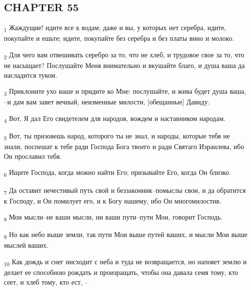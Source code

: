 \subsection{CHAPTER 55}
\begin{tcolorbox}
\textsubscript{1} Жаждущие! идите все к водам; даже и вы, у которых нет серебра, идите, покупайте и ешьте; идите, покупайте без серебра и без платы вино и молоко.
\end{tcolorbox}
\begin{tcolorbox}
\textsubscript{2} Для чего вам отвешивать серебро за то, что не хлеб, и трудовое свое за то, что не насыщает? Послушайте Меня внимательно и вкушайте благо, и душа ваша да насладится туком.
\end{tcolorbox}
\begin{tcolorbox}
\textsubscript{3} Приклоните ухо ваше и придите ко Мне: послушайте, и жива будет душа ваша, --и дам вам завет вечный, неизменные милости, [обещанные] Давиду.
\end{tcolorbox}
\begin{tcolorbox}
\textsubscript{4} Вот, Я дал Его свидетелем для народов, вождем и наставником народам.
\end{tcolorbox}
\begin{tcolorbox}
\textsubscript{5} Вот, ты призовешь народ, которого ты не знал, и народы, которые тебя не знали, поспешат к тебе ради Господа Бога твоего и ради Святаго Израилева, ибо Он прославил тебя.
\end{tcolorbox}
\begin{tcolorbox}
\textsubscript{6} Ищите Господа, когда можно найти Его; призывайте Его, когда Он близко.
\end{tcolorbox}
\begin{tcolorbox}
\textsubscript{7} Да оставит нечестивый путь свой и беззаконник--помыслы свои, и да обратится к Господу, и Он помилует его, и к Богу нашему, ибо Он многомилостив.
\end{tcolorbox}
\begin{tcolorbox}
\textsubscript{8} Мои мысли--не ваши мысли, ни ваши пути--пути Мои, говорит Господь.
\end{tcolorbox}
\begin{tcolorbox}
\textsubscript{9} Но как небо выше земли, так пути Мои выше путей ваших, и мысли Мои выше мыслей ваших.
\end{tcolorbox}
\begin{tcolorbox}
\textsubscript{10} Как дождь и снег нисходит с неба и туда не возвращается, но напояет землю и делает ее способною рождать и произращать, чтобы она давала семя тому, кто сеет, и хлеб тому, кто ест, --
\end{tcolorbox}

